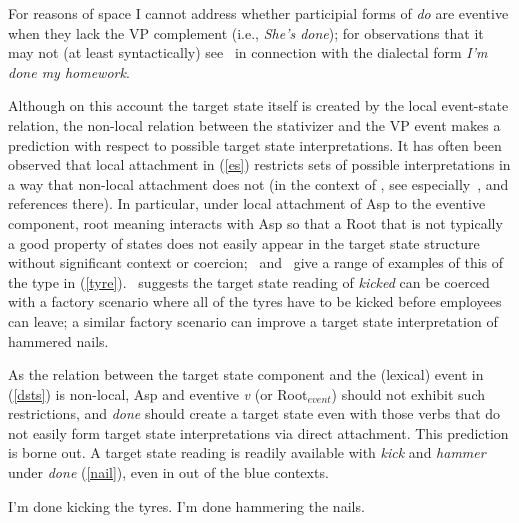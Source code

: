\documentclass[output=paper,modfonts,nonflat]{langsci/langscibook}
\begin{document}
For reasons of space I cannot address whether participial forms of \emph{do}
are eventive when they lack the VP complement (i.e., \emph{She's done}); for
observations that it may not (at least syntactically) see~\cite{Fruehwald2015a}
in connection with the dialectal form \emph{I'm done my homework}.

Although on this account the target state itself is created by the local
event-state relation, the non-local relation between the stativizer and the VP
event makes a prediction with respect to possible target state interpretations.
It has often been observed that  local attachment in (\ref{es}) restricts sets
of possible interpretations in a way that non-local attachment does not (in the
context of , see especially~\cite{Anagnostopoulou2013a}, and
references there). In particular, under local attachment of Asp to the eventive
component, root meaning interacts with Asp so that a Root that is not typically
a good property of states does not easily appear in the target state structure
without significant context or coercion;~\cite{Kratzer2001a}
and~\cite{Embick2009a} give a range of examples of this of the type in
(\ref{tyre}).~\cite{Embick2004a} suggests the target state reading of
\emph{kicked} can be coerced with a factory scenario where all of the tyres
have to be kicked before employees can leave; a similar factory scenario can
improve a target state interpretation of hammered nails.


\begin{exe}
\ex\label{tyre}
\begin{xlist}
\end{xlist}
\end{exe}

As the relation between the target state component and the (lexical) event in
(\ref{dsts}) is non-local, Asp and eventive \emph{v} (or Root$_{event}$) should
not exhibit such restrictions, and \emph{done} should create a target state
even with those verbs that do not easily form target state interpretations via
direct attachment. This prediction is borne out. A target state reading is
readily available with \emph{kick} and \emph{hammer} under \emph{done}
(\ref{nail}), even in out of the blue contexts.

\begin{exe}
\ex\label{nail}
\begin{xlist}
\ex I'm done kicking the tyres.
\ex I'm done hammering the nails.
\end{xlist}
\end{exe}
\end{document}
